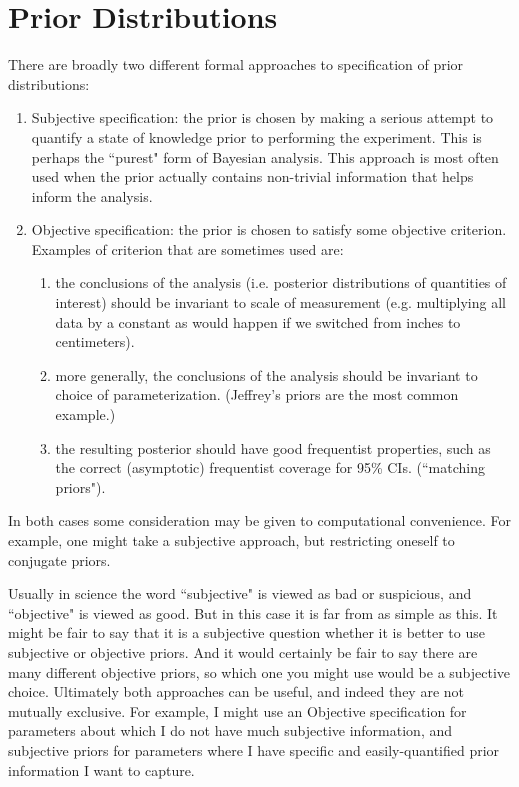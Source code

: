 \documentclass[12pt]{article}
\begin{document}
\section{Prior Distributions}

There are broadly two different formal approaches to specification of prior distributions:
\begin{enumerate}
\item Subjective specification: the prior is chosen by making a serious attempt to quantify a state of knowledge prior to performing the experiment. This is perhaps the ``purest" form of Bayesian analysis. This approach is most often used when the
prior actually contains non-trivial information that helps inform the analysis.
\item Objective specification: the prior is chosen to satisfy some objective criterion. 
Examples of criterion that are sometimes used are:
\begin{enumerate}
\item the conclusions of the analysis (i.e. posterior distributions of quantities of interest) should be invariant to scale of measurement (e.g. multiplying all data by a constant
as would happen if we switched from inches to centimeters). 
\item more generally, the conclusions of the analysis should be invariant to choice of parameterization. (Jeffrey's priors are the most common example.)
\item  the resulting posterior should have good frequentist properties, such as the correct (asymptotic) frequentist coverage for 95\% CIs. (``matching priors").
\end{enumerate}
\end{enumerate}
In both cases some consideration may be
given to computational convenience. For example,
one might take a subjective approach, but restricting
oneself to conjugate priors.

Usually in science the word ``subjective" is viewed as bad or suspicious, and ``objective" is viewed as good. But in this case it is far from as simple as this.
It might be fair to say that it is a subjective question whether it is better to use subjective or objective priors. And it would certainly be fair
to say there are many different objective priors, so which one you might use would be a subjective choice. Ultimately both approaches
can be useful, and indeed they are not mutually exclusive. For example, I might use an Objective specification for parameters about which I do not
have much subjective information, and subjective priors for parameters where I have specific and easily-quantified prior information I want to capture.
\end{document}
